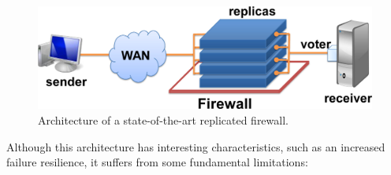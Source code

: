 \begin{figure}[!t]
\begin{center}
\includegraphics[width=.8\columnwidth]{images/images/arch_traditional.pdf}
\caption{\small Architecture of a state-of-the-art replicated firewall.}
\label{fig:traditional}
\end{center}
\end{figure}

Although this architecture has interesting characteristics, such as an increased failure resilience, it suffers from some fundamental limitations:

